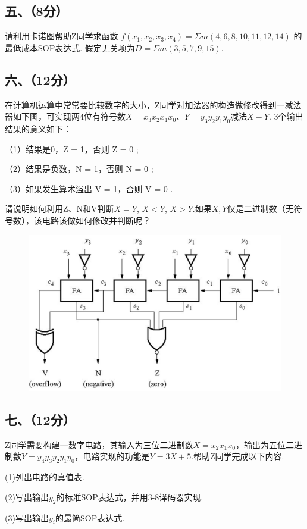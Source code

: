 \documentclass{ctexart}
\begin{document}
\newpage
\subsection*{五、（8分）}
请利用卡诺图帮助Z同学求函数 $f(x_1,x_2,x_3,x_4) = \Sigma m (4,6,8, 10 , 11 ,12,14)$ 的最低成本SOP表达式. 假定无关项为$D=\Sigma m(3,5,7,9,15)$.\par
\vspace{4cm}

\subsection*{六、（12分）}
在计算机运算中常常要比较数字的大小，Z同学对加法器的构造做修改得到一减法器如下图，可实现两4位有符号数$X=x_3x_2x_1x_0$、$Y=y_3y_2y_1y_0$减法$X-Y$. 3个输出结果的意义如下：\par
（1）结果是0，Z = 1，否则 Z = 0 ;\par
（2）结果是负数，N = 1，否则 N = 0 ;\par
（3）如果发生算术溢出 V = 1，否则 V = 0 .\par
请说明如何利用Z、N和V判断$X=Y$, $X<Y$, $X>Y$.如果$X,Y$仅是二进制数（无符号数），该电路该做如何修改并判断呢？\par
\vspace{-0.3cm}
\begin{figure}[htbp]
    \centering
    \includegraphics[width=0.7\linewidth]{4.png}
\end{figure}

\newpage
\subsection*{七、（12分）}
Z同学需要构建一数字电路，其输入为三位二进制数$X=x_2x_1x_0$，输出为五位二进制数$Y=y_4y_3y_2y_1y_0$，电路实现的功能是$Y=3X+5$.帮助Z同学完成以下内容.\par
(1)列出电路的真值表.\par
(2)写出输出$y_2$的标准SOP表达式，并用3-8译码器实现.\par
(3)写出输出$y_i$的最简SOP表达式.
\vspace{8cm}
\end{document}
